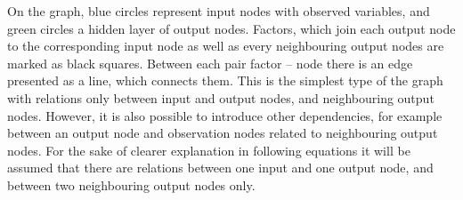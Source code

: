On the graph, blue circles represent input nodes with observed variables, and green circles a hidden layer of output nodes. Factors, which join each output node to the corresponding input node as well as every neighbouring output nodes are marked as black squares. Between each pair factor – node there is an edge presented as a line, which connects them. This is the simplest type of the graph with relations only between input and output nodes, and neighbouring output nodes. However, it is also possible to introduce other dependencies, for example between an output node and observation nodes related to neighbouring output nodes. For the sake of clearer explanation in following equations it will be assumed that there are relations between one input and one output node, and between two neighbouring output nodes only.

